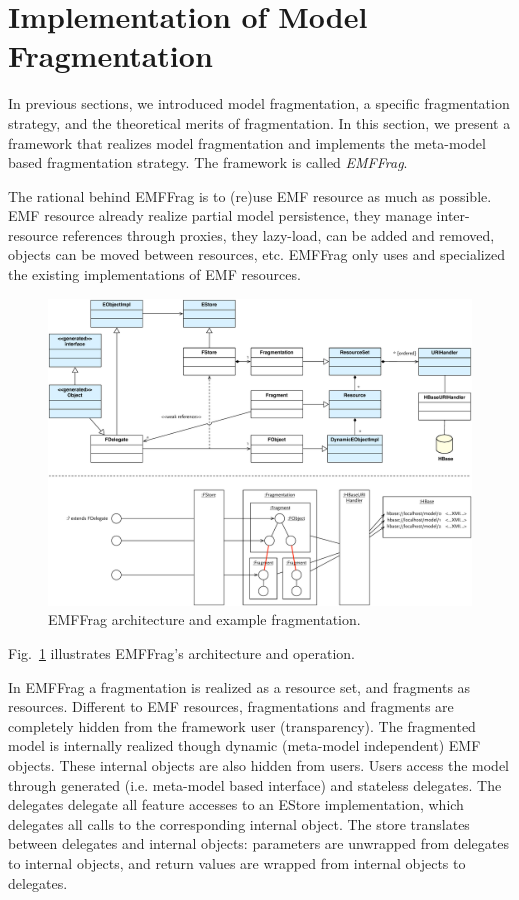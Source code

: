 \section{Implementation of Model Fragmentation}
\label{sec:implemention}

In previous sections, we introduced model fragmentation, a specific fragmentation strategy, and the theoretical merits of fragmentation. In this section, we present a framework that realizes model fragmentation and implements the meta-model based fragmentation strategy. The framework is called \emph{EMFFrag}.

The rational behind EMFFrag is to (re)use EMF resource as much as possible. EMF resource already realize partial model persistence, they manage inter-resource references through proxies, they lazy-load, can be added and removed, objects can be moved between resources, etc. EMFFrag only uses and specialized the existing implementations of EMF resources.

\begin{figure}
  \centering
  \includegraphics[width=\linewidth]{figures/architecture}
  \caption{EMFFrag architecture and example fragmentation.}
  \label{fig:architecture}
\end{figure}

Fig.~\ref{fig:architecture} illustrates EMFFrag's architecture and operation.

In EMFFrag a fragmentation is realized as a resource set, and fragments as resources. Different to EMF resources, fragmentations and fragments are completely hidden from the framework user (transparency). The fragmented model is internally realized though dynamic (meta-model independent) EMF objects. These internal objects are also hidden from users. Users access the model through generated (i.e. meta-model based interface) and stateless delegates. The delegates delegate all feature accesses to an EStore implementation, which delegates all calls to the corresponding internal object.  The store translates between delegates and internal objects: parameters are unwrapped from delegates to internal objects, and return values are wrapped from internal objects to delegates.

